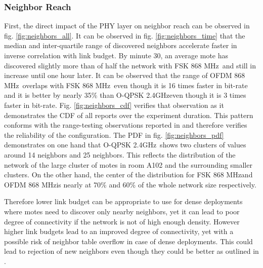 \documentclass[journal]{IEEEtran}
\newcommand{\fsk}          {FSK 868 MHz}
\newcommand{\oqpsk}        {O-QPSK 2.4GHz}
\newcommand{\ofdm}         {OFDM 868 MHz}
\begin{document}
\subsubsection{Neighbor Reach}
\label{sec:neighbor_reach}
First, the direct impact of the PHY layer on neighbor reach can be observed in fig. \ref{fig:neighbors_all}. 
It can be observed in fig. \ref{fig:neighbors_time} that the median and inter-quartile range of discovered neighbors accelerate faster in inverse correlation with link budget.
By minute 30, an average mote has discovered slightly more than of half the network with \fsk\ and still in increase until one hour later. It can be observed that the range of \ofdm\ overlaps with \fsk\ even though it is 16 times faster in bit-rate and it is better by nearly 35\% than \oqpsk even though it is 3 times faster in bit-rate.
Fig. \ref{fig:neighbors_cdf} verifies that observation as it demonstrates the CDF of all reports over the experiment duration. 
This pattern conforms with the range-testing observations reported in \cite{munoz18evaluationa} and therefore verifies the reliability of the configuration. 
The PDF in fig. \ref{fig:neighbors_pdf} demonstrates on one hand that \oqpsk\ shows two clusters of values around 14 neighbors and 25 neighbors. 
This reflects the distribution of the network of the large cluster of motes in room A102 and the surrounding smaller clusters. 
On the other hand, the center of the distribution for \fsk and \ofdm is nearly at 70\% and 60\% of the whole network size respectively.

Therefore lower link budget can be appropriate to use for dense deployments where motes need to discover only nearby neighbors, yet it can lead to poor degree of connectivity if the network is not of high enough density. 
However higher link budgets lead to an improved degree of connectivity, yet with a possible risk of neighbor table overflow in case of dense deployments.
This could lead to rejection of new neighbors even though they could be better as outlined in \cite{p.thuberted.00registration}. 
\end{document}
